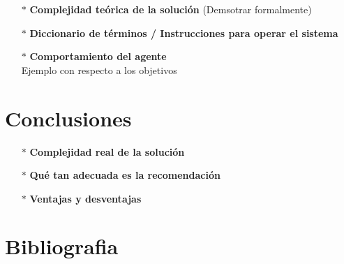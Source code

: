 \documentclass[10pt, a4paper]{article}
\begin{document}
\begin{enumerate}
\begin{enumerate}
\item[$\bullet$]Epis\'odico / Secuencial: Secuencial, pues dependiendo de las aplicaciones que seleccion\'o como sus favoritas, afectar\'an el c\'alculo de su recomendaci\'on. 
\item[$\bullet$]Discreto / Continuo: Discreto, pues se debe esperar a que el usuario seleccione sus gustos para poder hacer la recomendaci\'on. 
\item[$\bullet$]Est\'atico / Din\'amico: Est\'atico, el entorno de trabajo no cambia, siempre se usa el mismo dataset 
\item[$\bullet$]Agente: Multiagente, hay una interacci\'on entre el usuario y el software
\end{enumerate}
\item[$\ast$]\textbf{Complejidad teórica de la solución} (Demsotrar formalmente)
\item[$\ast$]\textbf{Diccionario de t\'erminos / Instrucciones para operar el sistema}
\item[$\ast$]\textbf{Comportamiento del agente} \\
Ejemplo con respecto a los objetivos 
\end{enumerate}
\section{Conclusiones}
\begin{enumerate}
\item[$\ast$]\textbf{Complejidad real de la soluci\'on}
\item[$\ast$]\textbf{Qué tan adecuada es la recomendaci\'on}
\item[$\ast$]\textbf{Ventajas y desventajas}
\end{enumerate}
\section{Bibliografia}
\end{document}
